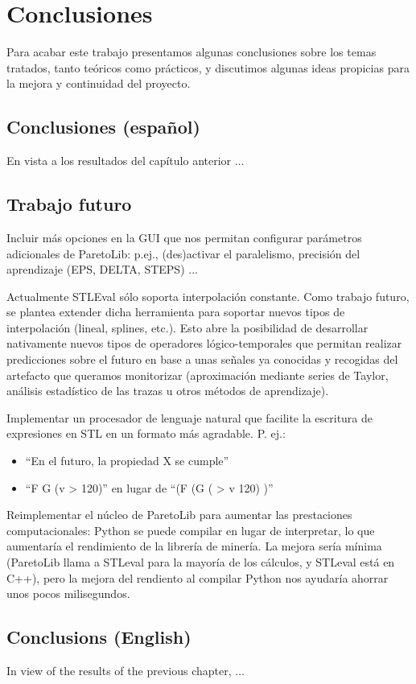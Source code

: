 \chapter{Conclusiones}
\label{cha:concl}
Para acabar este trabajo presentamos algunas conclusiones sobre los temas tratados, tanto teóricos como prácticos, y discutimos algunas ideas propicias para la mejora y continuidad del proyecto.
\section{Conclusiones (español)}
En vista a los resultados del capítulo anterior $\ldots$

\section{Trabajo futuro}

Incluir más opciones en la GUI que nos permitan configurar parámetros adicionales de ParetoLib: p.ej., (des)activar el paralelismo, precisión del aprendizaje (EPS, DELTA, STEPS) ...

Actualmente STLEval sólo soporta interpolación constante. Como trabajo futuro, se plantea extender dicha herramienta para soportar nuevos tipos de interpolación (lineal, splines, etc.). Esto abre la posibilidad de desarrollar nativamente nuevos tipos de operadores lógico-temporales que permitan realizar predicciones sobre el futuro en base a unas señales ya conocidas y recogidas del artefacto que queramos monitorizar (aproximación mediante series de Taylor, análisis estadístico de las trazas u otros métodos de aprendizaje).

Implementar un procesador de lenguaje natural que facilite la escritura de expresiones en STL en un formato más agradable. P. ej.:
\begin{itemize}
 \item ``En el futuro, la propiedad X se cumple''
 \item ``F G (v > 120)'' en lugar de ``(F (G ( > v 120) )''
\end{itemize}

Reimplementar el núcleo de ParetoLib para aumentar las prestaciones computacionales: Python se puede compilar en lugar de interpretar, lo que aumentaría el rendimiento de la librería de minería. La mejora sería mínima (ParetoLib llama a STLeval para la mayoría de los cálculos, y STLeval está en C++), pero la mejora del rendiento al compilar Python nos ayudaría ahorrar unos pocos milisegundos.

\section{Conclusions (English)}
In view of the results of the previous chapter, $\ldots$


